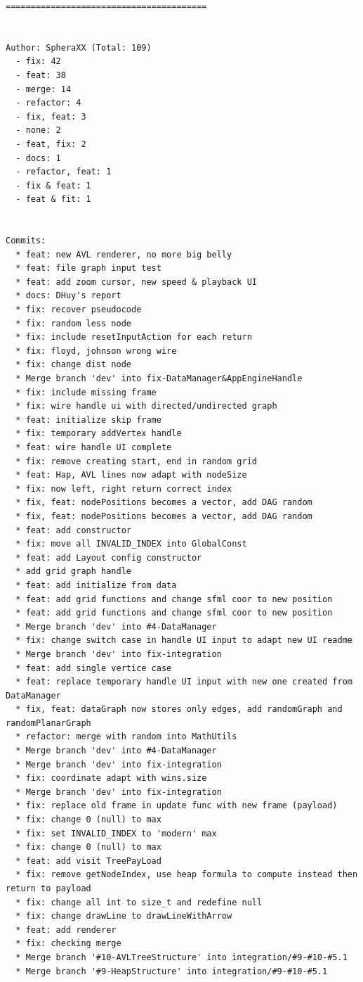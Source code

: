 \begin{small}
\begin{verbatim}
========================================


Author: SpheraXX (Total: 109)
  - fix: 42
  - feat: 38
  - merge: 14
  - refactor: 4
  - fix, feat: 3
  - none: 2
  - feat, fix: 2
  - docs: 1
  - refactor, feat: 1
  - fix & feat: 1
  - feat & fit: 1


Commits:
  * feat: new AVL renderer, no more big belly
  * feat: file graph input test
  * feat: add zoom cursor, new speed & playback UI
  * docs: DHuy's report
  * fix: recover pseudocode
  * fix: random less node
  * fix: include resetInputAction for each return
  * fix: floyd, johnson wrong wire
  * fix: change dist node
  * Merge branch 'dev' into fix-DataManager&AppEngineHandle
  * fix: include missing frame
  * fix: wire handle ui with directed/undirected graph
  * feat: initialize skip frame
  * fix: temporary addVertex handle
  * feat: wire handle UI complete
  * fix: remove creating start, end in random grid
  * feat: Hap, AVL lines now adapt with nodeSize
  * fix: now left, right return correct index
  * fix, feat: nodePositions becomes a vector, add DAG random
  * fix, feat: nodePositions becomes a vector, add DAG random
  * feat: add constructor
  * fix: move all INVALID_INDEX into GlobalConst
  * feat: add Layout config constructor
  * add grid graph handle
  * feat: add initialize from data
  * feat: add grid functions and change sfml coor to new position
  * feat: add grid functions and change sfml coor to new position
  * Merge branch 'dev' into #4-DataManager
  * fix: change switch case in handle UI input to adapt new UI readme
  * Merge branch 'dev' into fix-integration
  * feat: add single vertice case
  * feat: replace temporary handle UI input with new one created from DataManager
  * fix, feat: dataGraph now stores only edges, add randomGraph and randomPlanarGraph
  * refactor: merge with random into MathUtils
  * Merge branch 'dev' into #4-DataManager
  * Merge branch 'dev' into fix-integration
  * fix: coordinate adapt with wins.size
  * Merge branch 'dev' into fix-integration
  * fix: replace old frame in update func with new frame (payload)
  * fix: change 0 (null) to max
  * fix: set INVALID_INDEX to 'modern' max
  * fix: change 0 (null) to max
  * feat: add visit TreePayLoad
  * fix: remove getNodeIndex, use heap formula to compute instead then return to payload
  * fix: change all int to size_t and redefine null
  * fix: change drawLine to drawLineWithArrow
  * feat: add renderer
  * fix: checking merge
  * Merge branch '#10-AVLTreeStructure' into integration/#9-#10-#5.1
  * Merge branch '#9-HeapStructure' into integration/#9-#10-#5.1

\end{verbatim}
\end{small}
